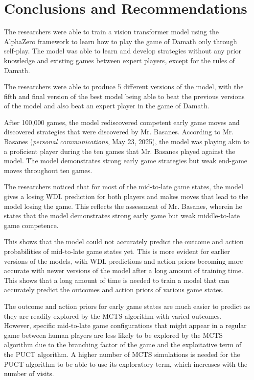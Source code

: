 \chapter{Conclusions and Recommendations} %


The researchers were able to train a vision transformer model using the AlphaZero framework to learn how to play the game of Damath only through self-play. The model was able to learn and develop strategies without any prior knowledge and existing games between expert players, except for the rules of Damath.

The researchers were able to produce 5 different versions of the model, with the fifth and final version of the best model being able to beat the previous versions of the model and also beat an expert player in the game of Damath. 

After 100,000 games, the model rediscovered competent early game moves and discovered strategies that were discovered by Mr. Basanes. According to Mr. Basanes (\textit{personal communications}, May 23, 2025), the model was playing akin to a proficient player during the ten games that Mr. Basanes played against the model. The model demonstrates strong early game strategies but weak end-game moves throughout ten games.


The researchers noticed that for most of the mid-to-late game states, the model gives a losing WDL prediction for both players and makes moves that lead to the model losing the game. This reflects the assessment of Mr. Basanes, wherein he states that the model demonstrates strong early game but weak middle-to-late game competence.

This shows that the model could not accurately predict the outcome and action probabilities of mid-to-late game states yet. This is more evident for earlier versions of the models, with WDL predictions and action priors becoming more accurate with newer versions of the model after a long amount of training time. This shows that a long amount of time is needed to train a model that can accurately predict the outcomes and action priors of various game states.

The outcome and action priors for early game states are much easier to predict as they are readily explored by the MCTS algorithm with varied outcomes. However, specific mid-to-late game configurations that might appear in a regular game between human players are less likely to be explored by the MCTS algorithm due to the branching factor of the game and the exploitative term of the PUCT algorithm. A higher number of MCTS simulations is needed for the PUCT algorithm to be able to use its exploratory term, which increases with the number of visits.


